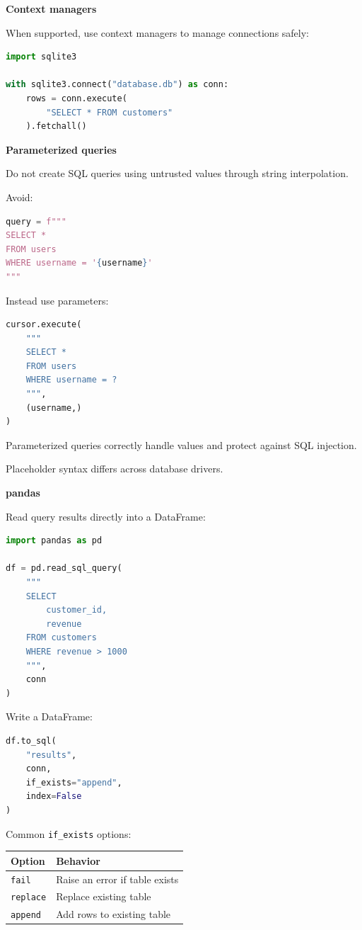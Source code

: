 \documentclass[11pt,letterpaper]{article}
\begin{document}
\textbf{Context managers}

When supported, use context managers to manage connections safely:

\begin{lstlisting}[language=Python]
import sqlite3

with sqlite3.connect("database.db") as conn:
    rows = conn.execute(
        "SELECT * FROM customers"
    ).fetchall()
\end{lstlisting}

\textbf{Parameterized queries}

Do not create SQL queries using untrusted values through string interpolation.

Avoid:

\begin{lstlisting}[language=Python]
query = f"""
SELECT *
FROM users
WHERE username = '{username}'
"""
\end{lstlisting}

Instead use parameters:

\begin{lstlisting}[language=Python]
cursor.execute(
    """
    SELECT *
    FROM users
    WHERE username = ?
    """,
    (username,)
)
\end{lstlisting}

Parameterized queries correctly handle values and protect against SQL
injection.

Placeholder syntax differs across database drivers.

\textbf{pandas}

Read query results directly into a DataFrame:

\begin{lstlisting}[language=Python]
import pandas as pd

df = pd.read_sql_query(
    """
    SELECT
        customer_id,
        revenue
    FROM customers
    WHERE revenue > 1000
    """,
    conn
)
\end{lstlisting}

Write a DataFrame:

\begin{lstlisting}[language=Python]
df.to_sql(
    "results",
    conn,
    if_exists="append",
    index=False
)
\end{lstlisting}

Common \texttt{if\_exists} options:

\begin{center}
\begin{tabular}{ll}
\toprule
Option & Behavior \\
\midrule
\texttt{fail} & Raise an error if table exists \\
\texttt{replace} & Replace existing table \\
\texttt{append} & Add rows to existing table \\
\bottomrule
\end{tabular}
\end{center}
\end{document}
